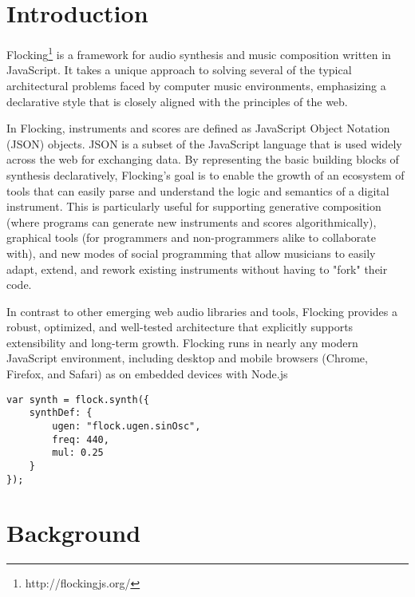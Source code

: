 \documentclass{article}
\title{\papertitle}
\begin{document}
%
\capstartfalse
\maketitle
\capstarttrue
%
\begin{abstract}
Flocking.js is an awesome language for the propagation of awesomeness in sound and web audio. (150-200 words)
\end{abstract}
%

\section{Introduction}\label{sec:introduction}

Flocking\footnote{http://flockingjs.org/} is a framework for audio synthesis and music composition written in JavaScript. It takes a unique approach to solving several of the typical architectural problems faced by computer music environments, emphasizing a declarative style that is closely aligned with the principles of the web.

In Flocking, instruments and scores are defined as JavaScript Object Notation (JSON) objects. JSON is a subset of the JavaScript language that is used widely across the web for exchanging data. By representing the basic building blocks of synthesis declaratively, Flocking’s goal is to enable the growth of an ecosystem of tools that can easily parse and understand the logic and semantics of a digital instrument. This is particularly useful for supporting generative composition (where programs can generate new instruments and scores algorithmically), graphical tools (for programmers and non-programmers alike to collaborate with), and new modes of social programming that allow musicians to easily adapt, extend, and rework existing instruments without having to "fork" their code.

In contrast to other emerging web audio libraries and tools, Flocking provides a robust, optimized, and well-tested architecture that explicitly supports extensibility and long-term growth. Flocking runs in nearly any modern JavaScript environment, including desktop and mobile browsers (Chrome, Firefox, and Safari) as on embedded devices with Node.js

\begin{verbatim}
var synth = flock.synth({
    synthDef: {
        ugen: "flock.ugen.sinOsc",
        freq: 440,
        mul: 0.25
    }
});
\end{verbatim}

\section{Background}
\end{document}
